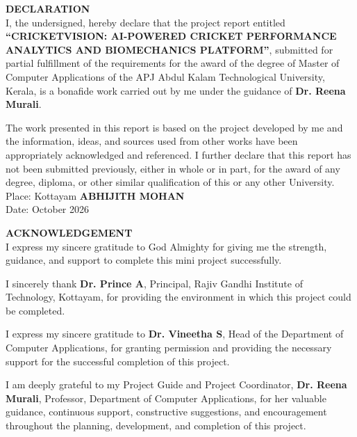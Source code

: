 \documentclass[12pt,a4paper]{report}
\begin{document}
\thispagestyle{empty}
\centering

{\Large\textbf{DECLARATION}}\\[1.2cm]

\justifying
I, the undersigned, hereby declare that the project report entitled \textbf{“CRICKETVISION: AI-POWERED CRICKET PERFORMANCE ANALYTICS AND BIOMECHANICS PLATFORM”}, submitted for partial fulfillment of the requirements for the award of the degree of Master of Computer Applications of the APJ Abdul Kalam Technological University, Kerala, is a bonafide work carried out by me under the guidance of \textbf{Dr. Reena Murali}.

The work presented in this report is based on the project developed by me and the information, ideas, and sources used from other works have been appropriately acknowledged and referenced. I further declare that this report has not been submitted previously, either in whole or in part, for the award of any degree, diploma, or other similar qualification of this or any other University.\\[2.5cm]

\noindent
Place: Kottayam \hfill \textbf{ABHIJITH MOHAN}\\[0.3cm]
Date: October 2026

\clearpage


\thispagestyle{empty}
\centering

{\Large\textbf{ACKNOWLEDGEMENT}}\\[1.2cm]

\justifying
I express my sincere gratitude to God Almighty for giving me the strength, guidance, and support to complete this mini project successfully.

I sincerely thank \textbf{Dr. Prince A}, Principal, Rajiv Gandhi Institute of Technology, Kottayam, for providing the environment in which this project could be completed.

I express my sincere gratitude to \textbf{Dr. Vineetha S}, Head of the Department of Computer Applications, for granting permission and providing the necessary support for the successful completion of this project.

I am deeply grateful to my Project Guide and Project Coordinator, \textbf{Dr. Reena Murali}, Professor, Department of Computer Applications, for her valuable guidance, continuous support, constructive suggestions, and encouragement throughout the planning, development, and completion of this project.
\end{document}
